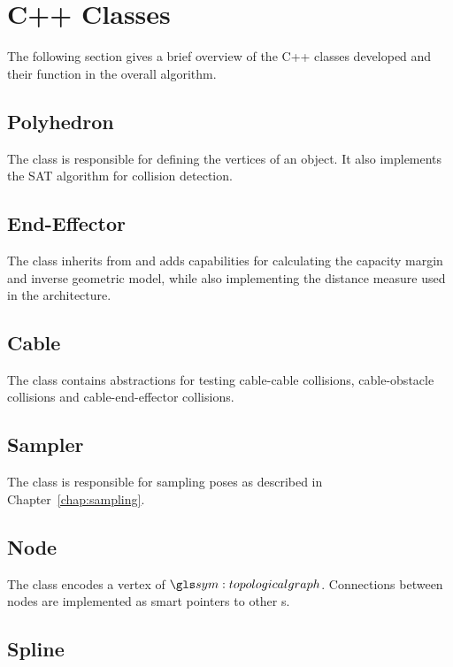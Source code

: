 	\section{C++ Classes}

		The following section gives a brief overview of the C++ classes
		developed and their function in the overall algorithm.

		\subsection{Polyhedron}

			The  class is responsible for defining the
			vertices of an object. It also implements the SAT algorithm for
			collision detection.

		\subsection{End-Effector}

			The  class inherits from 
			and adds capabilities for calculating the capacity margin and
			inverse geometric model, while also implementing the distance
			measure used in the architecture.

		\subsection{Cable}

			The  class contains abstractions for testing cable-cable
			collisions, cable-obstacle collisions and cable-end-effector
			collisions.

		\subsection{Sampler}

			The  class is responsible for sampling poses as
			described in Chapter~\ref{chap:sampling}.

		\subsection{Node}

			The  class encodes a vertex of $\topologicalgraph$.
			Connections between nodes are implemented as smart pointers to other
			s.

		\subsection{Spline}


